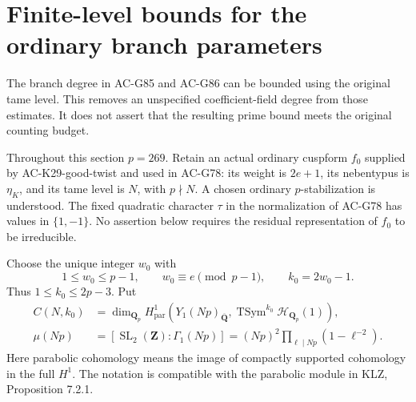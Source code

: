 \section{Finite-level bounds for the ordinary branch parameters}
\label{sec:G88}

The branch degree in AC-G85 and AC-G86 can be bounded using the
original tame level. This removes an unspecified coefficient-field
degree from those estimates. It does not assert that the resulting
prime bound meets the original counting budget.

Throughout this section \(p=269\). Retain an actual ordinary cuspform
\(f_0\) supplied by AC-K29-good-twist and used in AC-G78: its weight
is \(2e+1\), its nebentypus is \(\eta_K\), and its tame level is
\(N\), with \(p\nmid N\). A chosen ordinary \(p\)-stabilization is
understood. The fixed quadratic character \(\tau\) in the
normalization of AC-G78 has values in \(\{1,-1\}\).
No assertion below requires the residual representation of \(f_0\)
to be irreducible.

Choose the unique integer \(w_0\) with
\[
 1\leq w_0\leq p-1,\qquad w_0\equiv e\pmod{p-1},
 \qquad k_0=2w_0-1.
 \tag{G88.1}
\]
Thus \(1\leq k_0\leq 2p-3\). Put
\[
 \begin{split}
 C(N,k_0)&=\dim_{\mathbf Q_p}
 H^1_{\mathrm{par}}\left(
 Y_1(Np)_{\overline{\mathbf Q}},
 \operatorname{TSym}^{k_0}\mathscr H_{\mathbf Q_p}(1)\right),\\
 \mu(Np)&=[\operatorname{SL}_2(\mathbf Z):\Gamma_1(Np)]
 =(Np)^2\prod_{\ell\mid Np}(1-\ell^{-2}).
 \end{split}
 \tag{G88.2}
\]
Here parabolic cohomology means the image of compactly supported
cohomology in the full \(H^1\). The notation is compatible with
the parabolic module in KLZ, Proposition 7.2.1.


